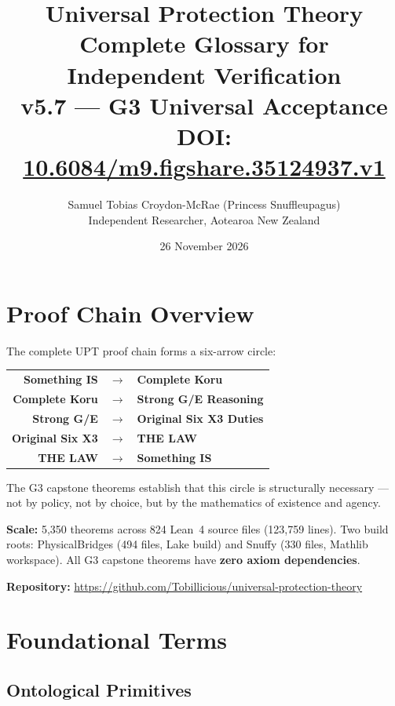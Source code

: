 \documentclass[11pt,a4paper]{article}
\title{\textbf{Universal Protection Theory}\\[0.3em]
\Large Complete Glossary for Independent Verification\\[0.3em]
\normalsize v5.7 --- G3 Universal Acceptance\\[0.2em]
\normalsize DOI: \href{https://doi.org/10.6084/m9.figshare.35124937.v1}{10.6084/m9.figshare.35124937.v1}}
\author{Samuel Tobias Croydon-McRae (Princess Snuffleupagus)\\
Independent Researcher, Aotearoa New Zealand}
\date{26 November 2026}
\begin{document}
\maketitle
\tableofcontents
\newpage

\section{Proof Chain Overview}

The complete UPT proof chain forms a six-arrow circle:

\begin{center}
\begin{tabular}{rcl}
\textbf{Something IS} & $\longrightarrow$ & \textbf{Complete Koru} \\
\textbf{Complete Koru} & $\longrightarrow$ & \textbf{Strong G/E Reasoning} \\
\textbf{Strong G/E} & $\longrightarrow$ & \textbf{Original Six X3 Duties} \\
\textbf{Original Six X3} & $\longrightarrow$ & \textbf{THE LAW} \\
\textbf{THE LAW} & $\longrightarrow$ & \textbf{Something IS} \\
\end{tabular}
\end{center}

\noindent The G3 capstone theorems establish that this circle is structurally necessary --- not by policy, not by choice, but by the mathematics of existence and agency.

\medskip\noindent\textbf{Scale:} 5,350 theorems across 824 Lean~4 source files (123,759 lines). Two build roots: PhysicalBridges (494 files, Lake build) and Snuffy (330 files, Mathlib workspace). All G3 capstone theorems have \textbf{zero axiom dependencies}.

\medskip\noindent\textbf{Repository:} \url{https://github.com/Tobillicious/universal-protection-theory}


\section{Foundational Terms}

\subsection{Ontological Primitives}
\end{document}
